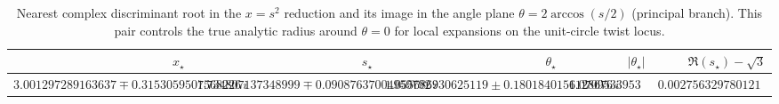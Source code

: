 \begin{table}[H]
\centering
\scriptsize
\setlength{\tabcolsep}{6pt}
\caption{Nearest complex discriminant root in the $x=s^2$ reduction and its image in the angle plane $\theta=2\arccos(s/2)$ (principal branch). This pair controls the true analytic radius around $\theta=0$ for local expansions on the unit-circle twist locus.}
\label{tab:sync_kernel_hatdelta_nearest_complex_branch_point}
\begin{tabular}{r r r r r}
\toprule
$x_\star$ & $s_\star$ & $\theta_\star$ & $|\theta_\star|$ & $\Re(s_\star)-\sqrt3$\\
\midrule
$3.001297289163637 \mp 0.3153059507568226\,i$ & $1.734807137348999 \mp 0.09087637004959792\,i$ & $1.055686930625119 \pm 0.1801840156128676\,i$ & $1.070953395332898$ & $0.002756329780121777$\\
\bottomrule
\end{tabular}
\end{table}
